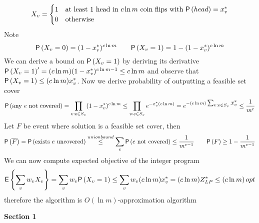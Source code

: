 \documentclass[11pt]{article}
\begin{document}
\begin{enumerate}
\begin{enumerate}
        \[
            X_v =
            \begin{cases}
                1 & \text{at least 1 head in $c\ln m$ coin flips with } \P{head} = x_v^* \\
                0 & \text{otherwise}
            \end{cases}    
        \]
        Note 
        \[
            \P{X_v=0} = (1 - x_v^*)^{c\ln m} 
            \qquad 
            \P{X_v=1} = 1 - (1 - x_v^*)^{c\ln m} 
        \]
        We can derive a bound on $\P{X_v=1}$ by deriving its derivative $\P{X_v=1}' = (c\ln m)(1-x_v^*)^{c\ln m - 1} \leq c\ln m$ and observe that $\P{X_v=1} \leq (c\ln m)x_v^*$. Now we derive probability of outputting a feasible set cover
        \[
            \P{\text{any $e$ not covered}} 
            = \prod_{v:e\in S_v} (1 - x_v^*)^{c\ln m} 
            \leq \prod_{v:e\in S_v} e^{-x_v^* (c\ln m)}
            = e^{-(c\ln m) \textstyle\sum_{v:e\in S_v} x_v^*} 
            \leq \frac{1}{m^c}
        \]
        Let $F$ be event where solution is a feasible set cover, then 
        \[
            \P{\overline{F}} 
            = \P{\text{exists $e$ uncovered}}
            \overset{unionbound}{\leq} \sum_e \P{\text{$e$ not covered}}
            \leq \frac{1}{m^{c-1}}
            \qquad 
            \P{F} \geq 1 - \frac{1}{m^{c-1}}
        \]
        We can now compute expected objective of the integer program 
        \[
            \E{\sum_{v} w_v X_v} 
            = \sum_v w_v \P{X_v = 1} 
            \leq \sum_v w_v (c\ln m)x_v^* 
            = (c\ln m) Z_{LP}^*
            \leq (c\ln m) \, opt
        \]
        therefore the algorithm is $O(\ln m)$-approximation algorithm
    \end{enumerate}
\end{enumerate}


\textbf{Section 1 }
\end{document}
